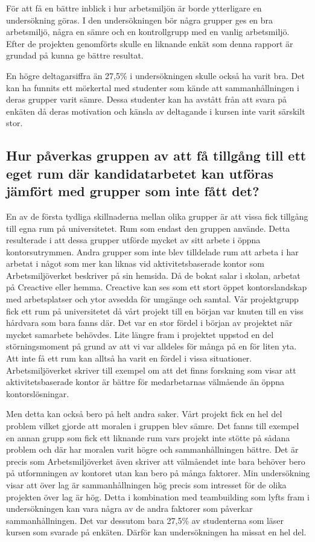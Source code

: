 För att få en bättre inblick i hur arbetsmiljön är borde ytterligare en undersökning göras. I den undersökningen bör några grupper ges en bra arbetsmiljö, några en sämre och en kontrollgrupp med en vanlig arbetsmiljö. Efter de projekten genomförts skulle en liknande enkät som denna rapport är grundad på kunna ge bättre resultat. 

En högre deltagarsiffra än 27,5\% i undersökningen skulle också ha varit bra. Det kan ha funnits ett mörkertal med studenter som kände att sammanhållningen i deras grupper varit sämre. Dessa studenter kan ha avstått från att svara på enkäten då deras motivation och känsla av deltagande i kursen inte varit särskilt stor.

\subsection{Hur påverkas gruppen av att få tillgång till ett eget rum där kandidatarbetet kan utföras jämfört med grupper som inte fått det?}
En av de första tydliga skillnaderna mellan olika grupper är att vissa fick tillgång till egna rum på universitetet. Rum som endast den gruppen använde. Detta resulterade i att dessa grupper utförde mycket av sitt arbete i öppna kontorsutrymmen. Andra grupper som inte blev tilldelade rum att arbeta i har arbetat i något som mer kan liknas vid aktivitetsbaserade kontor som Arbetsmiljöverket beskriver på sin hemsida. Då de bokat salar i skolan, arbetat på Creactive eller hemma. Creactive kan ses som ett stort öppet kontorslandskap med arbetsplatser och ytor avsedda för umgänge och samtal. Vår projektgrupp fick ett rum på universitetet då vårt projekt till en början var knuten till en viss hårdvara som bara fanns där. Det var en stor fördel i början av projektet när mycket samarbete behövdes. Lite längre fram i projektet uppstod en del störningsmoment på grund av att vi var alldeles för många på en för liten yta. Att inte få ett rum kan alltså ha varit en fördel i vissa situationer. Arbetsmiljöverket skriver till exempel om att det finns forskning som visar att aktivitetsbaserade kontor är bättre för medarbetarnas välmående än öppna kontorslösningar. 

Men detta kan också bero på helt andra saker. Vårt projekt fick en hel del problem vilket gjorde att moralen i gruppen blev sämre. Det fanns till exempel en annan grupp som fick ett liknande rum vars projekt inte stötte på sådana problem och där har moralen varit högre och sammanhållningen bättre. Det är precis som Arbetsmiljöverket även skriver att välmåendet inte bara behöver bero på utformningen av kontoret utan kan bero på många faktorer. Min undersökning visar att över lag är sammanhållningen hög precis som intresset för de olika projekten över lag är hög. Detta i kombination med teambuilding som lyfts fram i undersökningen kan vara några av de andra faktorer som påverkar sammanhållningen. Det var dessutom bara 27,5\% av studenterna som läser kursen som svarade på enkäten. Därför kan undersökningen ha missat en hel del.

